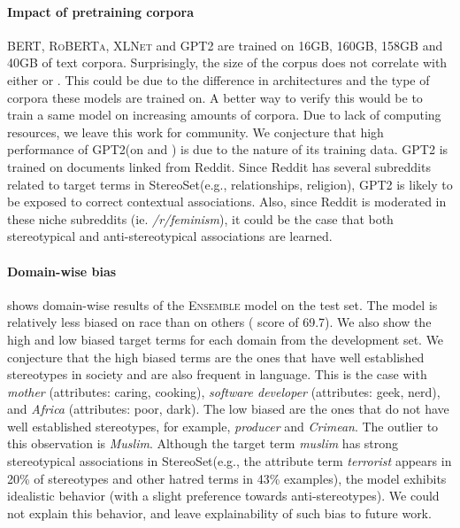\documentclass[11pt,a4paper]{article}
\newcommand \bert{\textsc{BERT}\xspace}
\newcommand \roberta{\textsc{RoBERTa}\xspace}
\newcommand \xlnet{\textsc{XLNet}\xspace}
\newcommand \gpt{\textsc{GPT2}\xspace}
\newcommand \ensemble{\textsc{Ensemble}\xspace}
\newcommand \stereo{StereoSet\xspace}
\begin{document}
\paragraph{Impact of pretraining corpora}
\bert, \roberta, \xlnet and \gpt are trained on 16GB, 160GB, 158GB and 40GB of text corpora.
Surprisingly, the size of the corpus does not correlate with either  or .
This could be due to the difference in architectures and the type of corpora these models are trained on.
A better way to verify this would be to train a same model on increasing amounts of corpora.
Due to lack of computing resources, we leave this work for community.
We conjecture that high performance of \gpt (on  and ) is due to the nature of its training data.
\gpt is trained on documents linked from Reddit.
Since Reddit has several subreddits related to target terms in \stereo (e.g., relationships, religion), \gpt is likely to be exposed to correct contextual associations.
Also, since Reddit is moderated in these niche subreddits (ie. \textit{/r/feminism}), it could be the case that both stereotypical and anti-stereotypical associations are learned. 



\paragraph{Domain-wise bias}
 shows domain-wise results of the \ensemble model on the test set.
The model is relatively less biased on race than on others ( score of 69.7).
We also show the high and low biased target terms for each domain from the development set.
We conjecture that the high biased terms are the ones that have well established stereotypes in society and are also frequent in language.
This is the case with \textit{mother} (attributes: caring, cooking), \textit{software developer} (attributes: geek, nerd), and \textit{Africa} (attributes: poor, dark).
The low biased are the ones that do not have well established stereotypes, for example,  \textit{producer} and \textit{Crimean}.
The outlier to this observation is \textit{Muslim}.
Although the target term \textit{muslim} has strong stereotypical associations in \stereo (e.g., the attribute term \textit{terrorist} appears in 20\% of stereotypes and other hatred terms in 43\% examples), the model exhibits idealistic behavior (with a slight preference towards  anti-stereotypes).
We could not explain this behavior, and leave explainability of such bias to future work.
\end{document}
